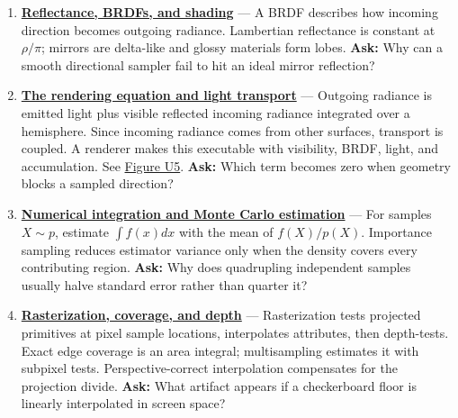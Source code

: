 \begin{enumerate}
\item
  \textbf{\href{Continuous\%20Notes/University\%20-\%20Worlds,\%20Images\%20and\%20Inference\%20-\%20Graphics,\%20Vision\%20and\%20Photography\#Reflectance,\%20BRDFs,\%20and\%20shading}{Reflectance, BRDFs, and shading}} --- A BRDF describes how incoming direction becomes outgoing radiance. Lambertian reflectance is constant at \(\rho/\pi\); mirrors are delta-like and glossy materials form lobes. \textbf{Ask:} Why can a smooth directional sampler fail to hit an ideal mirror reflection?
\item
  \textbf{\href{Continuous\%20Notes/University\%20-\%20Worlds,\%20Images\%20and\%20Inference\%20-\%20Graphics,\%20Vision\%20and\%20Photography\#The\%20rendering\%20equation\%20and\%20light\%20transport}{The rendering equation and light transport}} --- Outgoing radiance is emitted light plus visible reflected incoming radiance integrated over a hemisphere. Since incoming radiance comes from other surfaces, transport is coupled. A renderer makes this executable with visibility, BRDF, light, and accumulation. See \href{Continuous\%20Notes/University\%20-\%20Worlds,\%20Images\%20and\%20Inference\%20-\%20Graphics,\%20Vision\%20and\%20Photography\#Figure\%20U5\%20-\%20A\%20direct-light\%20renderer\%20makes\%20the\%20pipeline\%20executable}{Figure U5}. \textbf{Ask:} Which term becomes zero when geometry blocks a sampled direction?
\item
  \textbf{\href{Continuous\%20Notes/University\%20-\%20Worlds,\%20Images\%20and\%20Inference\%20-\%20Graphics,\%20Vision\%20and\%20Photography\#Numerical\%20integration\%20and\%20Monte\%20Carlo\%20estimation}{Numerical integration and Monte Carlo estimation}} --- For samples \(X\sim p\), estimate \(\int f(x)dx\) with the mean of \(f(X)/p(X)\). Importance sampling reduces estimator variance only when the density covers every contributing region. \textbf{Ask:} Why does quadrupling independent samples usually halve standard error rather than quarter it?
\item
  \textbf{\href{Continuous\%20Notes/University\%20-\%20Worlds,\%20Images\%20and\%20Inference\%20-\%20Graphics,\%20Vision\%20and\%20Photography\#Rasterization,\%20coverage,\%20and\%20depth}{Rasterization, coverage, and depth}} --- Rasterization tests projected primitives at pixel sample locations, interpolates attributes, then depth-tests. Exact edge coverage is an area integral; multisampling estimates it with subpixel tests. Perspective-correct interpolation compensates for the projection divide. \textbf{Ask:} What artifact appears if a checkerboard floor is linearly interpolated in screen space?

\end{enumerate}
